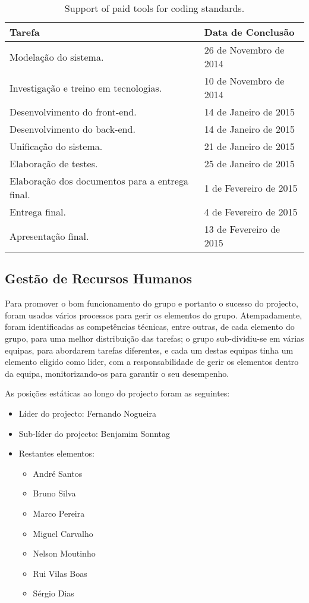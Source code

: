 \begin{table}[H]\centering
    \begin{tabular}{@{}p{}l@{}}\toprule
    Tarefa & Data de Conclusão \\
    \midrule
    Modelação do sistema. & 26 de Novembro de 2014 \\
    Investigação e treino em tecnologias. & 10 de Novembro de 2014 \\
    Desenvolvimento do front-end. & 14 de Janeiro de 2015 \\
    Desenvolvimento do back-end. & 14 de Janeiro de 2015 \\
    Unificação do sistema. & 21 de Janeiro de 2015 \\
    Elaboração de testes. & 25 de Janeiro de 2015 \\
    Elaboração dos documentos para a entrega final. & 1 de Fevereiro de 2015 \\
    Entrega final. & 4 de Fevereiro de 2015 \\
    Apresentação final. & 13 de Fevereiro de 2015 \\
    \bottomrule
    \end{tabular}
    \caption{Support of paid tools for coding standards.}
    \label{tab:tool_support}
\end{table}

\subsection*{Gestão de Recursos Humanos}
Para promover o bom funcionamento do grupo e portanto o sucesso do projecto, foram usados vários processos para gerir os elementos do grupo.
Atempadamente, foram identificadas as competências técnicas, entre outras, de cada elemento do grupo, para uma melhor distribuição das tarefas; o grupo sub-dividiu-se em várias equipas, para abordarem tarefas diferentes, e cada um destas equipas tinha um elemento eligido como lider, com a responsabilidade de gerir os elementos dentro da equipa, monitorizando-os para garantir o seu desempenho.

As posições estáticas ao longo do projecto foram as seguintes:
\begin{itemize}
    \item Líder do projecto: Fernando Nogueira
    \item Sub-líder do projecto: Benjamim Sonntag
    \item Restantes elementos:
        \begin{itemize}
            \item André Santos
            \item Bruno Silva
            \item Marco Pereira
            \item Miguel Carvalho
            \item Nelson Moutinho
            \item Rui Vilas Boas
            \item Sérgio Dias
        \end{itemize}
\end{itemize}

